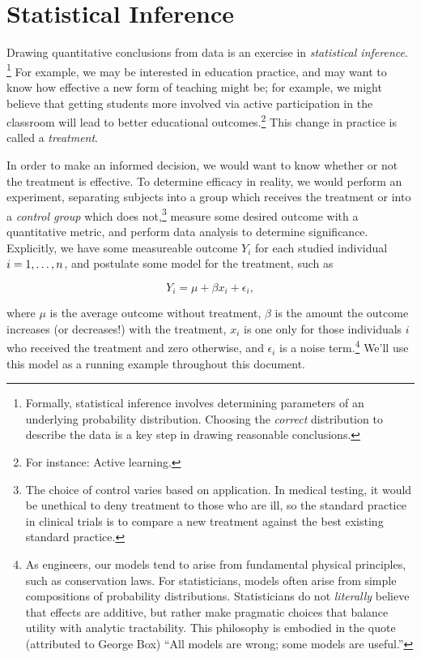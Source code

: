 \documentclass{tufte-handout}
\begin{document}
\section{Statistical Inference}
\label{sec:org874eb35}
Drawing quantitative conclusions from data is an exercise in \emph{statistical
inference}. \footnote{Formally, statistical inference involves determining parameters
of an underlying probability distribution. Choosing the \emph{correct} distribution
to describe the data is a key step in drawing reasonable conclusions.} For
example, we may be interested in education practice, and may want to know how
effective a new form of teaching might be; for example, we might believe that
getting students more involved via active participation in the classroom will
lead to better educational outcomes.\footnote{For instance: Active
learning.\cite{freeman2014active}} This change in practice is called a
\emph{treatment}.

In order to make an informed decision, we would want to know whether or not the
treatment is effective. To determine efficacy in reality, we would perform an
experiment, separating subjects into a group which receives the treatment or
into a \emph{control group} which does not,\footnote{The choice of control varies based on
application. In medical testing, it would be unethical to deny treatment to
those who are ill, so the standard practice in clinical trials is to compare a
new treatment against the best existing standard practice.} measure some desired
outcome with a quantitative metric, and perform data analysis to determine
significance. Explicitly, we have some measureable outcome \(Y_i\) for each
studied individual \(i=\nobreak1,\dots,n\), and postulate some model for the treatment,
such as

\begin{equation}\label{eq:model}
  Y_i = \mu + \beta x_i + \epsilon_i,
\end{equation}

where \(\mu\) is the average outcome without treatment, \(\beta\) is the amount the
outcome increases (or decreases!) with the treatment, \(x_i\) is one only for
those individuals \(i\) who received the treatment and zero otherwise, and
\(\epsilon_i\) is a noise term.\footnote{As engineers, our models tend to arise from
fundamental physical principles, such as conservation laws. For statisticians,
models often arise from simple compositions of probability distributions.
Statisticians do not \emph{literally} believe that effects are additive, but rather
make pragmatic choices that balance utility with analytic tractability. This
philosophy is embodied in the quote (attributed to George Box) ``All models are
wrong; some models are useful.''} We'll use this model as a running example
throughout this document.
\end{document}
